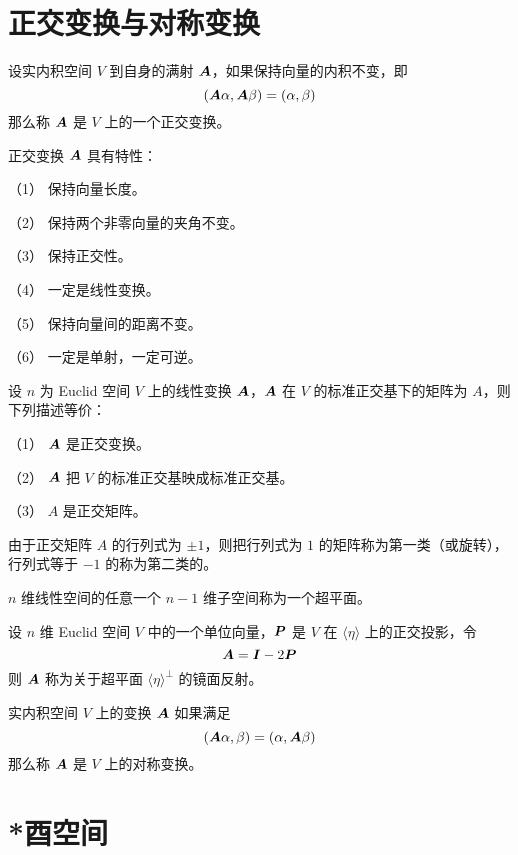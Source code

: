 \section{正交变换与对称变换}

\begin{definition}
	设实内积空间 $V$ 到自身的满射 $\boldsymbol{A}$，如果保持向量的内积不变，即
	\[ (\boldsymbol{A}\alpha,\boldsymbol{A}\beta) = (\alpha,\beta) \]
	那么称 $\boldsymbol{A}$ 是 $V$ 上的一个正交变换。
\end{definition}

\begin{proposition}
	正交变换 $\boldsymbol{A}$ 具有特性：
	
	（1） 保持向量长度。
	
	（2） 保持两个非零向量的夹角不变。
	
	（3） 保持正交性。
	
	（4） 一定是线性变换。
	
	（5） 保持向量间的距离不变。
	
	（6） 一定是单射，一定可逆。
\end{proposition}

\begin{theorem}
	设 $n$ 为 Euclid 空间 $V$ 上的线性变换 $\boldsymbol{A}$，$\boldsymbol{A}$ 在 $V$ 的标准正交基下的矩阵为 $A$，则下列描述等价：
	
	（1） $\boldsymbol{A}$ 是正交变换。
	
	（2） $\boldsymbol{A}$ 把 $V$ 的标准正交基映成标准正交基。
	
	（3） $A$ 是正交矩阵。
\end{theorem}

由于正交矩阵 $A$ 的行列式为 $\pm 1$，则把行列式为 $1$ 的矩阵称为第一类（或旋转），行列式等于 $-1$ 的称为第二类的。

$n$ 维线性空间的任意一个 $n-1$ 维子空间称为一个超平面。

\begin{definition}
	设 $n$ 维 Euclid 空间 $V$ 中的一个单位向量，$\boldsymbol{P}$ 是 $V$ 在 $\langle \eta \rangle$ 上的正交投影，令
	\[ \boldsymbol{A} = \boldsymbol{I} - 2 \boldsymbol{P} \]
	则 $\boldsymbol{A}$ 称为关于超平面 $\langle \eta \rangle^\bot$ 的镜面反射。
\end{definition}

\begin{definition}
	实内积空间 $V$ 上的变换 $\boldsymbol{A}$ 如果满足
	\[ (\boldsymbol{A}\alpha,\beta) = (\alpha,\boldsymbol{A}\beta) \]
	那么称 $\boldsymbol{A}$ 是 $V$ 上的对称变换。
\end{definition}

\section{*酉空间}

